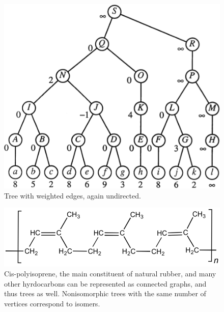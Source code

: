 \documentclass[a4paper,10pt]{report}
\begin{document}
\begin{figure}[H]
	\begin{centering}
	\begin{center}
	\includegraphics[width=\linewidth]{./topology-tree.png}
	\caption{Tree with weighted edges, again undirected.}
	\label{fig:??????}
	\end{center}
	\par\end{centering}
\end{figure}

\begin{figure}[h!]
	\begin{centering}
	\begin{center}
	\includegraphics[width=\linewidth]{./chemistry.png}
	\caption{Cis-polyisoprene, the main constituent of natural rubber, and many other hyrdocarbons can be represented as connected graphs, and thus trees as well. Nonisomorphic trees with the same number of vertices correspond to isomers.}
	\label{fig:??????}
	\end{center}
	\par\end{centering}
\end{figure}
\end{document}
